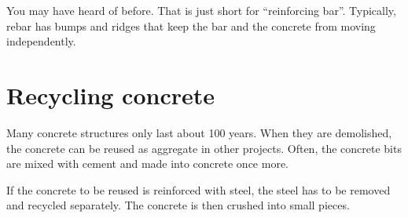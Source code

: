 You may have heard of  before. That is just short for
``reinforcing bar''.  Typically, rebar has bumps and ridges that keep
the bar and the concrete from moving independently.

\section{Recycling concrete}

Many concrete structures only last about 100 years. When they are
demolished, the concrete can be reused as aggregate in other projects.
Often, the concrete bits are mixed with cement and made into concrete once more.

If the concrete to be reused is reinforced with steel, the steel has
to be removed and recycled separately.  The concrete is then crushed
into small pieces.
